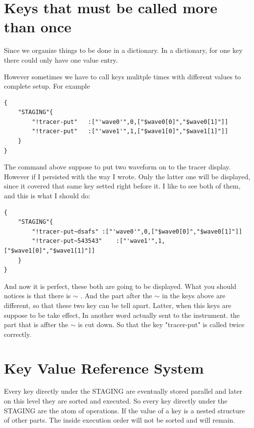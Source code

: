 \documentclass{article}
\begin{document}
\section{Keys that must be called more than once}


Since we organize things to be done in a dictionary.
In a dictionary, for one key there could only have one value entry.

However sometimes we have to call keys mulitple times with 
	different values to complete setup.
For example

\begin{lstlisting}
{ 
	"STAGING"{
		"!tracer-put"	:["'wave0'",0,["$wave0[0]","$wave0[1]"]]
		"!tracer-put"	:["'wave1'",1,["$wave1[0]","$wave1[1]"]]
	}
}
\end{lstlisting}

The command above suppose to put two waveform 
	on to the tracer display.
However if I persisted with the way I wrote. Only the latter
	one will be displayed, since it covered that same key setted
	right before it.
I  like to see both of them, and this is what I should do:

\begin{lstlisting}
{ 
	"STAGING"{
		"!tracer-put~dsafs"	:["'wave0'",0,["$wave0[0]","$wave0[1]"]]
		"!tracer-put~543543"	:["'wave1'",1,["$wave1[0]","$wave1[1]"]]
	}
}
\end{lstlisting}

And now it is perfect, these both are going to be displayed.
What you should notices is that there is $\sim$ .
And the part after the $\sim$ in the keys above are different,
	so that these two key can be tell apart.
Latter, when this keys are suppose to be take effect, In another
	word actually sent to the instrument. the part that is affter the 
$\sim$ is cut down.
So that the key "tracer-put" is called twice correctly.

\section{Key Value Reference System}
Every key directly under the STAGING are eventually stored parallel 
	and later on this level they are sorted and executed.
So every key directly under the STAGING are the atom of operations.
If the value of a key is a nested structure of other parts.
The inside execution order will not be sorted and will remain.
\end{document}
